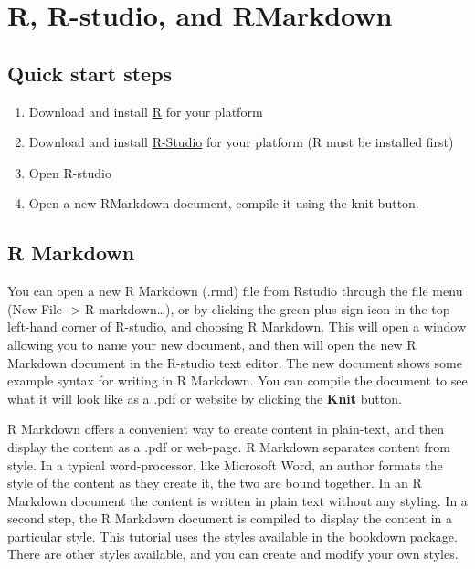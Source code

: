 \documentclass[]{book}
\providecommand{\tightlist}{%
  \setlength{\itemsep}{0pt}\setlength{\parskip}{0pt}}
\begin{document}
\chapter{R, R-studio, and RMarkdown}\label{r-r-studio-and-rmarkdown}

\section{Quick start steps}\label{quick-start-steps}

\begin{enumerate}
\def\labelenumi{\arabic{enumi}.}
\tightlist
\item
  Download and install \href{https://www.r-project.org}{R} for your
  platform
\item
  Download and install \href{https://www.rstudio.com}{R-Studio} for your
  platform (R must be installed first)
\item
  Open R-studio
\item
  Open a new RMarkdown document, compile it using the knit button.
\end{enumerate}

\section{R Markdown}\label{r-markdown}

You can open a new R Markdown (.rmd) file from Rstudio through the file
menu (New File -\textgreater{} R markdown\ldots{}), or by clicking the
green plus sign icon in the top left-hand corner of R-studio, and
choosing R Markdown. This will open a window allowing you to name your
new document, and then will open the new R Markdown document in the
R-studio text editor. The new document shows some example syntax for
writing in R Markdown. You can compile the document to see what it will
look like as a .pdf or website by clicking the \textbf{Knit} button.

R Markdown offers a convenient way to create content in plain-text, and
then display the content as a .pdf or web-page. R Markdown separates
content from style. In a typical word-processor, like Microsoft Word, an
author formats the style of the content as they create it, the two are
bound together. In an R Markdown document the content is written in
plain text without any styling. In a second step, the R Markdown
document is compiled to display the content in a particular style. This
tutorial uses the styles available in the
\href{https://bookdown.org/yihui/bookdown/}{bookdown} package. There are
other styles available, and you can create and modify your own styles.
\end{document}
